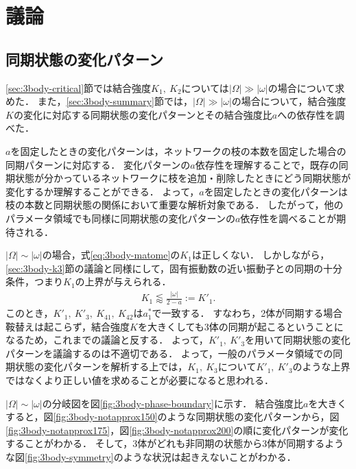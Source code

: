 \documentclass[../main]{subfiles}
\begin{document}
\section{議論}
\label{sec:3body-discussion}
\subsection{同期状態の変化パターン}
\ref{sec:3body-critical}節では結合強度$K_1,\ K_2$については$|\Omega|\gg|\omega|$の場合について求めた．
また，\ref{sec:3body-summary}節では，$|\Omega|\gg|\omega|$の場合について，結合強度$K$の変化に対応する同期状態の変化パターンとその結合強度比$a$への依存性を調べた．

$a$を固定したときの変化パターンは，ネットワークの枝の本数を固定した場合の同期パターンに対応する．
変化パターンの$a$依存性を理解することで，既存の同期状態が分かっているネットワークに枝を追加・削除したときにどう同期状態が変化するか理解することができる．
よって，$a$を固定したときの変化パターンは枝の本数と同期状態の関係において重要な解析対象である．
したがって，他のパラメータ領域でも同様に同期状態の変化パターンの$a$依存性を調べることが期待される．

$|\Omega|\sim|\omega|$の場合，式\eqref{eq:3body-matome}の$K_1$は正しくない．
しかしながら，\ref{sec:3body-k3}節の議論と同様にして，固有振動数の近い振動子との同期の十分条件，つまり$K_1$の上界が与えられる．
\begin{align}
    \label{K1-approx-dash}
    K_1\lessapprox\frac{|\omega|}{2-a}:=K'_1.
\end{align}
このとき，$K'_1,\ K'_3,\ K_{41},\ K_{42}$は$a^\ast_1$で一致する．
すなわち，2体が同期する場合鞍替えは起こらず，結合強度$K$を大きくしても3体の同期が起こるということになるため，これまでの議論と反する．
よって，$K'_1,\ K'_3$を用いて同期状態の変化パターンを議論するのは不適切である．
よって，一般のパラメータ領域での同期状態の変化パターンを解析する上では，$K_1,\ K_3$について$K'_1,\ K'_3$のような上界ではなくより正しい値を求めることが必要になると思われる．

$|\Omega|\sim|\omega|$の分岐図を図\ref{fig:3body-phase-boundary}に示す．
結合強度比$a$を大きくすると，図\ref{fig:3body-notapprox150}のような同期状態の変化パターンから，図\ref{fig:3body-notapprox175}，図\ref{fig:3body-notapprox200}の順に変化パターンが変化することがわかる．
そして，3体がどれも非同期の状態から3体が同期するような図\ref{fig:3body-symmetry}のような状況は起きえないことがわかる．
\end{document}

